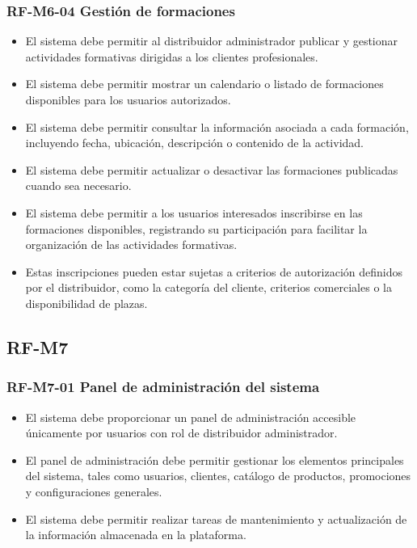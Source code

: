 \vspace{-0.75em}
\subsubsection{RF-M6-04 Gestión de formaciones}
\vspace{-1em}

\begin{itemize}
    \item El sistema debe permitir al distribuidor administrador publicar y gestionar actividades formativas dirigidas a los clientes profesionales.
    \item El sistema debe permitir mostrar un calendario o listado de formaciones disponibles para los usuarios autorizados.
    \item El sistema debe permitir consultar la información asociada a cada formación, incluyendo fecha, ubicación, descripción o contenido de la actividad.
    \item El sistema debe permitir actualizar o desactivar las formaciones publicadas cuando sea necesario.
    \item El sistema debe permitir a los usuarios interesados inscribirse en las formaciones disponibles, registrando su participación para facilitar la organización de las actividades formativas.
    \item Estas inscripciones pueden estar sujetas a criterios de autorización definidos por el distribuidor, como la categoría del cliente, criterios comerciales o la disponibilidad de plazas.
\end{itemize}

\subsection{RF-M7}

\vspace{-0.75em}
\subsubsection{RF-M7-01 Panel de administración del sistema}
\vspace{-1em}

\begin{itemize}
    \item El sistema debe proporcionar un panel de administración accesible únicamente por usuarios con rol de distribuidor administrador.
    \item El panel de administración debe permitir gestionar los elementos principales del sistema, tales como usuarios, clientes, catálogo de productos, promociones y configuraciones generales.
    \item El sistema debe permitir realizar tareas de mantenimiento y actualización de la información almacenada en la plataforma.
\end{itemize}

